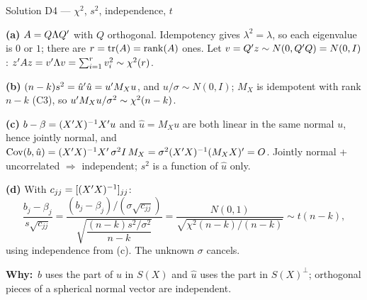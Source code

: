 \documentclass[11pt]{article}
\newcommand{\step}[1]{\par\smallskip\noindent\textbf{\textcolor{qnavy}{#1}}\quad\ignorespaces}
\newcommand{\Why}{\textbf{\textcolor{whyline}{Why:}}\ }
\begin{document}
\begin{solbox}{Solution D4 --- $\chi^{2}$, $s^{2}$, independence, $t$}
\step{(a)} $A = Q\Lambda Q^{\prime}$ with $Q$ orthogonal. Idempotency gives $\lambda^{2} = \lambda$, so each
eigenvalue is $0$ or $1$; there are $r = \mathrm{tr}(A) = \operatorname{rank}(A)$ ones. Let $v = Q^{\prime} z \sim N(0, Q^{\prime} Q) = N(0,I)$:
$z^{\prime} Az = v^{\prime}\Lambda v = \sum_{i=1}^{r}v_{i}^{2} \sim \chi^{2}(r)$.
\step{(b)} $(n-k)s^{2} = \hat u^{\prime}\hat u = u^{\prime} M_{X}u$, and $u/\sigma \sim N(0,I)$; $M_{X}$ is
idempotent with rank $n-k$ (C3), so $u^{\prime} M_{X}u/\sigma^{2} \sim \chi^{2}(n-k)$.
\step{(c)} $b - \beta = (X^{\prime} X)^{-1}X^{\prime} u$ and $\hat u = M_{X}u$ are both linear in the same normal
$u$, hence jointly normal, and
$\operatorname{Cov}(b, \hat u) = (X^{\prime} X)^{-1}X^{\prime}\,\sigma^{2}I\,M_{X} = \sigma^{2}(X^{\prime} X)^{-1}(M_{X}X)^{\prime} = O$.
Jointly normal + uncorrelated $\Rightarrow$ independent; $s^{2}$ is a function of $\hat u$ only.
\step{(d)} With $c_{jj} = [(X^{\prime} X)^{-1}]_{jj}$:
\[
  \frac{b_{j} - \beta_{j}}{s\sqrt{c_{jj}}}
  = \frac{(b_{j} - \beta_{j})/(\sigma\sqrt{c_{jj}})}{\sqrt{\dfrac{(n-k)s^{2}/\sigma^{2}}{n-k}}}
  = \frac{N(0,1)}{\sqrt{\chi^{2}(n-k)/(n-k)}} \sim t(n-k),
\]
using independence from (c). The unknown $\sigma$ cancels.
\begin{why}\Why $b$ uses the part of $u$ in $S(X)$ and $\hat u$ uses the part in
$S(X)^{\perp}$; orthogonal pieces of a spherical normal vector are independent.\end{why}
\end{solbox}
\end{document}
